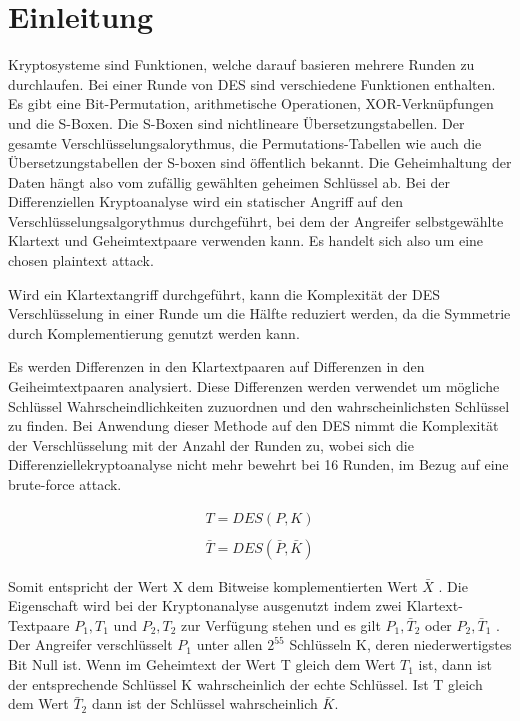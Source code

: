 \clearpage
\section{Einleitung}\label{sec:Einleitung}
Kryptosysteme sind Funktionen, welche darauf basieren mehrere Runden zu durchlaufen. Bei einer Runde von DES sind verschiedene Funktionen enthalten.
Es gibt eine Bit-Permutation, arithmetische Operationen, XOR-Verknüpfungen und die S-Boxen. Die S-Boxen sind nichtlineare Übersetzungstabellen. 
Der gesamte Verschlüsselungsalorythmus, die Permutations-Tabellen wie auch die Übersetzungstabellen der S-boxen sind öffentlich bekannt. 
Die Geheimhaltung der Daten hängt also vom zufällig gewählten geheimen Schlüssel ab. 
Bei der Differenziellen Kryptoanalyse wird ein statischer Angriff auf den Verschlüsselungsalgorythmus durchgeführt, bei dem der Angreifer selbstgewählte Klartext und Geheimtextpaare verwenden kann. Es handelt sich also um eine chosen plaintext attack.  

Wird ein Klartextangriff durchgeführt, kann die Komplexität der DES Verschlüsselung in einer Runde um die Hälfte reduziert werden, da die Symmetrie durch Komplementierung genutzt werden kann.

Es werden Differenzen in den Klartextpaaren auf Differenzen in den Geiheimtextpaaren analysiert. Diese Differenzen werden verwendet um mögliche Schlüssel Wahrscheindlichkeiten zuzuordnen und den wahrscheinlichsten Schlüssel zu finden. Bei Anwendung dieser Methode auf den DES nimmt die Komplexität der Verschlüsselung mit der Anzahl der Runden zu, wobei sich die Differenziellekryptoanalyse nicht mehr bewehrt bei 16 Runden, im Bezug auf eine brute-force attack.
 
 \begin{eqnarray*}
 T=DES(P,K)\\
 \\
  \bar{T}=DES(\bar{P},\bar{K})
 \end{eqnarray*}
 
 Somit entspricht der Wert X dem Bitweise komplementierten Wert $\bar{X}$ . Die Eigenschaft wird bei der Kryptonanalyse ausgenutzt indem zwei Klartext-Textpaare $P_{1} ,T_{1}$ und $P_{2} ,T_{2}$ zur Verfügung stehen und es gilt ${P}_{1} ,\bar{T}_{2}$ oder ${P}_{2} ,\bar{T}_{1}$ . Der Angreifer verschlüsselt $P_{1}$ unter allen $2^{55}$ Schlüsseln K, deren niederwertigstes Bit Null ist. Wenn im Geheimtext der Wert T gleich dem Wert $T_{1}$ ist, dann ist der entsprechende Schlüssel K wahrscheinlich der echte Schlüssel. Ist T gleich dem Wert $\bar{T}_{2}$ dann ist der Schlüssel wahrscheinlich $\bar{K}$. 






